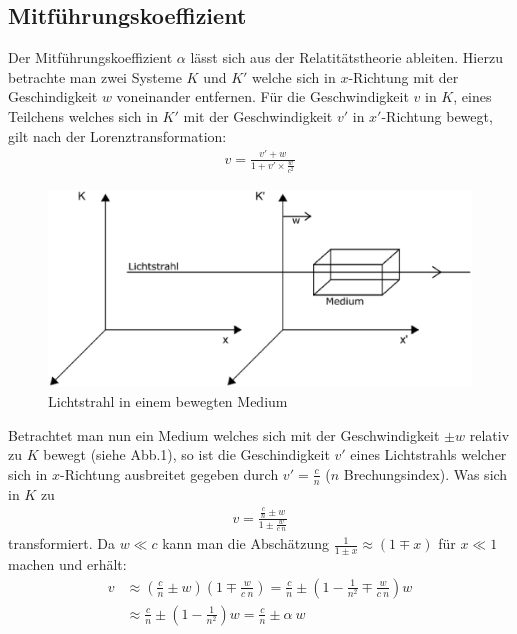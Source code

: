 \documentclass[12pt]{article}
\begin{document}
\subsection{Mitführungskoeffizient}
Der Mitführungskoeffizient $\alpha$ lässt sich aus der Relatitätstheorie ableiten. Hierzu betrachte man zwei Systeme $K$ und $K'$ welche sich in $x$-Richtung
mit der Geschindigkeit $w$ voneinander entfernen. Für die Geschwindigkeit $v$ in $K$, eines Teilchens welches sich in $K'$ mit der Geschwindigkeit $v'$ 
in $x'$-Richtung bewegt, gilt nach der Lorenztransformation:
\begin{align}
 v = \frac{v' + w}{1 + v'\times\frac{w}{c^2}}
\end{align}

\begin{figure}[H]  
\centering
\includegraphics[width=0.9\linewidth]{pictures/abb1.eps}
\caption{Lichtstrahl in einem bewegten Medium}
\label{abb1}
\end{figure}

Betrachtet man nun ein Medium welches sich mit der Geschwindigkeit $\pm w$ relativ zu $K$ bewegt (siehe Abb.1), so ist die Geschindigkeit $v'$ 
eines Lichtstrahls welcher sich in $x$-Richtung ausbreitet gegeben durch $v' = \frac{c}{n}$ ($n$ Brechungsindex). Was sich in $K$ zu 
\begin{align}
 v = \frac{\frac{c}{n} \pm w}{1 \pm \frac{w}{c \ n}}
\end{align}
transformiert. Da $w \ll c$ kann man die Abschätzung $\frac{1}{1 \pm x} \approx (1 \mp x)$ für $x \ll 1$ machen und erhält:
\begin{align}
 v &\approx \left( \frac{c}{n} \pm w\right) \left( 1 \mp \frac{w}{c \ n}\right) = \frac{c}{n} \pm \left( 1 - \frac{1}{n^2} \mp \frac{w}{c \ n}\right) w \\
 \label{fresneldreck}  &\approx \frac{c}{n} \pm \left( 1 - \frac{1}{n^2}\right) w = \frac{c}{n} \pm \alpha \ w
\end{align}
\end{document}
